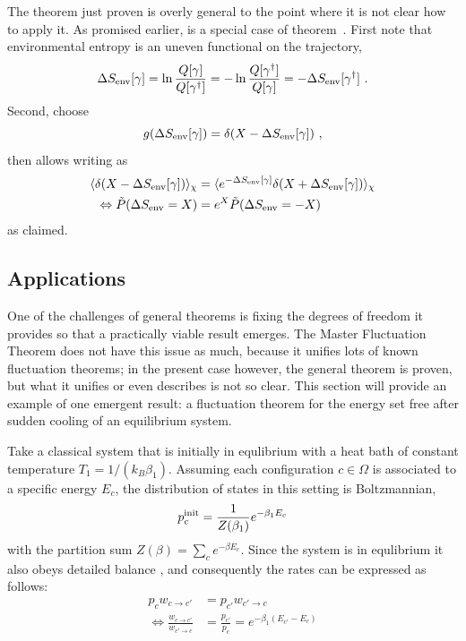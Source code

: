 The theorem just proven is overly general to the point where it is not clear how to apply it. As promised earlier,  is a special case of theorem~. First note that environmental entropy is an uneven functional on the trajectory,
\begin{equation}
	  \Delta S_\text{env}[\gamma]
	= \ln\frac{Q[\gamma]}{Q[\gamma^\dagger]}
	= -\ln\frac{Q[\gamma^\dagger]}{Q[\gamma]}
	= -\Delta S_\text{env}[\gamma^\dagger] ~.
\end{equation}
%
Second, choose
\begin{equation}
	g(\Delta S_\text{env}[\gamma]) = \delta(X - \Delta S_\text{env}[\gamma]) ~,
\end{equation}
%
then  allows writing  as
%
\begin{align*}
		\langle \delta(X - \Delta S_\text{env}[\gamma])\rangle_\chi
		&=
		\langle e^{-\Delta S_\text{env}[\gamma]}\delta(X + \Delta S_\text{env}[\gamma])\rangle_\chi
	\\ \Leftrightarrow
		\tilde P(\Delta S_\text{env} = X)
		&=
		e^X \tilde P(\Delta S_\text{env} = -X)
\end{align*}
%
as claimed.





\subsection{Applications}
\label{sec:thingie-applications}

One of the challenges of general theorems is fixing the degrees of freedom it provides so that a practically viable result emerges. The Master Fluctuation Theorem \cite{seifert-review} does not have this issue as much, because it unifies lots of known fluctuation theorems; in the present case however, the general theorem is proven, but what it unifies or even describes is not so clear. This section will provide an example of one emergent result: a fluctuation theorem for the energy set free after sudden cooling of an equilibrium system.

Take a classical system that is initially in equlibrium with a heat bath of constant temperature \(T_1 = 1/(k_B\beta_1)\). Assuming each configuration \(c\in\Omega\) is associated to a specific energy \(E_c\), the distribution of states in this setting is Boltzmannian,
%
\begin{equation}
	p_c^{\text{init}} = \frac1{Z(\beta_1)}e^{-\beta_1E_c}
\end{equation}
%
with the partition sum \(Z(\beta) = \sum_ce^{-\beta E_c}\). Since the system is in equlibrium it also obeys detailed balance , and consequently the rates can be expressed as follows:
%
\begin{align}
	p_c w_{c\to c'} &= p_{c'} w_{c'\to c}
	\\
	\Leftrightarrow
		   \frac{w_{c\to c'}}{w_{c'\to c}}
		&= \frac{p_{c'}}{p_c}
		 = e^{-\beta_1(E_{c'}-E_c)}
\end{align}

